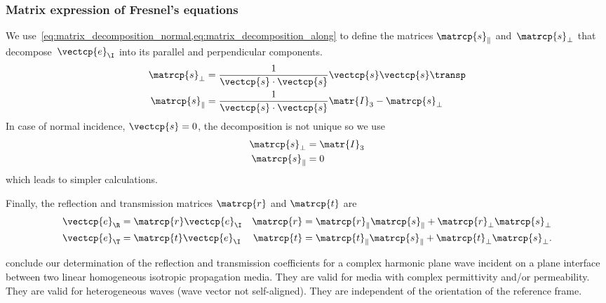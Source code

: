 \begin{refsection}
\subsubsection{Matrix expression of Fresnel's equations}
\label{sec:fresnel_matrix}
We use~\cref{eq:matrix_decomposition_normal,eq:matrix_decomposition_along} to define the matrices $\matrcp{s}_\parallel$ and~$\matrcp{s}_\perp$ that decompose~$\vectcp{e}_\I$ into its parallel and perpendicular components.
\begin{subequations}
    \begin{align}
        \matrcp{s}_\perp &= \frac{1}{\vectcp{s} \cdot \vectcp{s}} \vectcp{s} \vectcp{s}\transp
        \label{eq:s_perp}
        \\
        \matrcp{s}_\parallel &= \frac{1}{\vectcp{s} \cdot \vectcp{s}} \matr{I}_3 - \matrcp{s}_\perp
        \label{eq:s_para}
    \end{align}
\end{subequations}
In case of normal incidence, $\vectcp{s}=0$, the decomposition is not unique so we use
\begin{subequations}
    \begin{align}
        \matrcp{s}_\perp &= \matr{I}_3
        \label{eq:s_perp_normal}
        \\
        \matrcp{s}_\parallel &= 0
        \label{eq:s_para_normal}
    \end{align}
\end{subequations}
which leads to simpler calculations.

Finally, the reflection and transmission matrices $\matrcp{r}$ and $\matrcp{t}$ are
\begin{subequations}
    \begin{align}
        \vectcp{e}_\R &= \matrcp{r} \vectcp{e}_\I
        &
        \matrcp{r}
        &=
        \matrcp{r}_\parallel \matrcp{s}_\parallel +
        \matrcp{r}_\perp     \matrcp{s}_\perp
        \label{eq:fresnel_reflection_matrix}
        \\
        \vectcp{e}_\T &= \matrcp{t} \vectcp{e}_\I
        &
        \matrcp{t}
        &=
        \matrcp{t}_\parallel \matrcp{s}_\parallel +
        \matrcp{t}_\perp     \matrcp{s}_\perp
        \text{.}
        \label{eq:fresnel_transmission_matrix}
    \end{align}
\end{subequations}

 conclude our determination of the reflection and transmission coefficients for a complex harmonic plane wave incident on a plane interface between two linear homogeneous isotropic propagation media.
They are valid for media with complex permittivity and/or permeability.
They are valid for heterogeneous waves (wave vector not self-aligned).
They are independent of the orientation of the reference frame.


\end{refsection}
